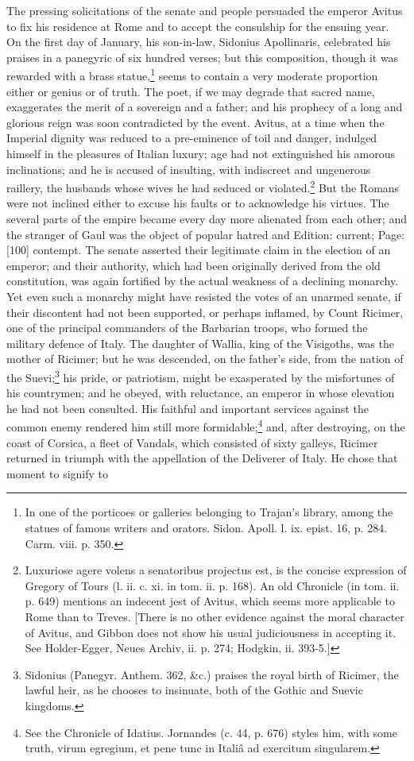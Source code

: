 The pressing solicitations of the senate and people persuaded the emperor Avitus to fix his residence at Rome and to accept the consulship for the ensuing year. On the first day of January, his son-in-law, Sidonius Apollinaris, celebrated his praises in a panegyric of six hundred verses; but this composition, though it was rewarded with a brass statue,\footnote{In one of the porticoes or galleries belonging to Trajan\texthebrew{}’s library, among the statues of famous writers and orators. Sidon. Apoll. l. ix. epist. 16, p. 284. Carm. viii. p. 350.} seems to contain a very moderate proportion either or genius or of truth. The poet, if we may degrade that sacred name, exaggerates the merit of a sovereign and a father; and his prophecy of a long and glorious reign was soon contradicted by the event. Avitus, at a time when the Imperial dignity was reduced to a pre-eminence of toil and danger, indulged himself in the pleasures of Italian luxury; age had not extinguished his amorous inclinations; and he is accused of insulting, with indiscreet and ungenerous raillery, the husbands whose wives he had seduced or violated.\footnote{Luxuriose agere volens a senatoribus projectus est, is the concise expression of Gregory of Tours (l. ii. c. xi. in tom. ii. p. 168). An old Chronicle (in tom. ii. p. 649) mentions an indecent jest of Avitus, which seems more applicable to Rome than to Treves. [There is no other evidence against the moral character of Avitus, and Gibbon does not show his usual judiciousness in accepting it. See Holder-Egger, Neues Archiv, ii. p. 274; Hodgkin, ii. 393-5.]} But the Romans were not inclined either to excuse his faults or to acknowledge his virtues. The several parts of the empire became every day more alienated from each other; and the stranger of Gaul was the object of popular hatred and Edition: current; Page: [100] contempt. The senate asserted their legitimate claim in the election of an emperor; and their authority, which had been originally derived from the old constitution, was again fortified by the actual weakness of a declining monarchy. Yet even such a monarchy might have resisted the votes of an unarmed senate, if their discontent had not been supported, or perhaps inflamed, by Count Ricimer, one of the principal commanders of the Barbarian troops, who formed the military defence of Italy. The daughter of Wallia, king of the Visigoths, was the mother of Ricimer; but he was descended, on the father\texthebrew{}’s side, from the nation of the Suevi;\footnote{Sidonius (Panegyr. Anthem. 362, \&c.) praises the royal birth of Ricimer, the lawful heir, as he chooses to insinuate, both of the Gothic and Suevic kingdoms.} his pride, or patriotism, might be exasperated by the misfortunes of his countrymen; and he obeyed, with reluctance, an emperor in whose elevation he had not been consulted. His faithful and important services against the common enemy rendered him still more formidable;\footnote{See the Chronicle of Idatius. Jornandes (c. 44, p. 676) styles him, with some truth, virum egregium, et pene tunc in Italiâ ad exercitum singularem.} and, after destroying, on the coast of Corsica, a fleet of Vandals, which consisted of sixty galleys, Ricimer returned in triumph with the appellation of the Deliverer of Italy. He chose that moment to signify to 